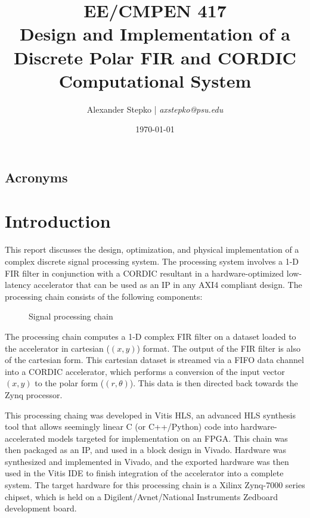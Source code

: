 \documentclass[11pt]{report}
\title{\normalsize{EE/CMPEN 417}\Large\\\textbf{Design and Implementation of a Discrete Polar FIR and CORDIC Computational System}}
\author{Alexander Stepko | \emph{axstepko@psu.edu}}
\affil{The Pennsylvania State University\\School of Electrical Engineering and Computer Science\\\normalsize{Zheyu Li, PhD. Candidate}}
\date{\today}
\begin{document}
\begin{titlepage}
    \maketitle
\end{titlepage}
\begin{singlespace}
    \tableofcontents
\end{singlespace}
\newpage
\section*{Acronyms}
\begin{multicols}{2}
    \raggedright
    \printacronyms[heading=none]
\end{multicols}
\listoffigures
\listoftables
\newpage

\chapter{Introduction}



This report discusses the design, optimization, and physical implementation of a complex discrete signal processing system. The processing system involves a 1-D \ac{FIR} filter in conjunction with a \ac{CORDIC} resultant in a hardware-optimized low-latency accelerator that can be used as an IP in any AXI4 compliant design. The processing chain consists of the following components:
\begin{figure}[h!]
	\centering
	\fboxsep=3mm
	\caption{Signal processing chain}
	\label{processingChainGraph}
\end{figure}

The processing chain computes a 1-D complex FIR filter on a dataset loaded to the accelerator in cartesian ($(x, y)$) format. The output of the FIR filter is also of the cartesian form. This cartesian dataset is streamed via a FIFO data channel into a CORDIC accelerator, which performs a conversion of the input vector $(x, y)$ to the polar form ($(r, \theta)$). This data is then directed back towards the Zynq processor.

This processing chaing was developed in Vitis HLS, an advanced \ac{HLS} synthesis tool that allows seemingly linear C (or C++/Python) code into hardware-accelerated models targeted for implementation on an \ac{FPGA}. This chain was then packaged as an \ac{IP}, and used in a block design in Vivado. Hardware was synthesized and implemented in Vivado, and the exported hardware was then used in the Vitis IDE to finish integration of the accelerator into a complete system. The target hardware for this processing chain is a Xilinx Zynq-7000 series chipset, which is held on a Digilent/Avnet/National Instruments Zedboard development board.
\end{document}
